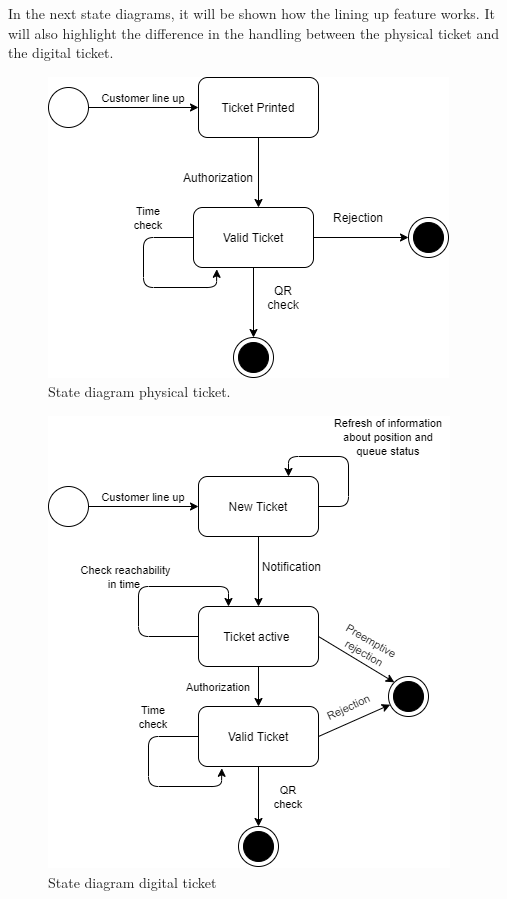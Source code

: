 In the next state diagrams, it will be shown how the lining up feature works. It will also highlight the difference in the handling between the physical ticket and the digital ticket.


\begin{figure}[H]
	\centering
	\includegraphics[scale = 0.5]{images/TicketPhysical.png}
	\caption{State diagram physical ticket.}
\end{figure}


\begin{figure}[H]
	\centering
	\includegraphics[scale = 0.5]{images/statechart.png}
	\caption{State diagram digital ticket}
\end{figure}

